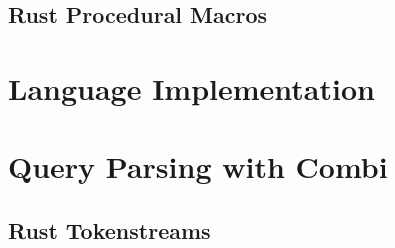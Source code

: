 \subsection{Rust Procedural Macros}

\section{Language Implementation}





\section{Query Parsing with Combi}
\subsection{Rust Tokenstreams}

